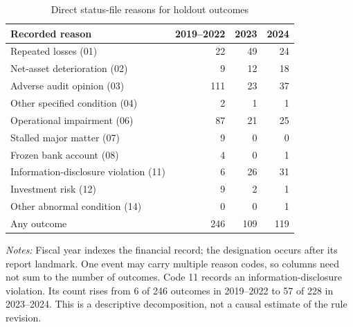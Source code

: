 \begin{table}[H]
\centering
\caption{Direct status-file reasons for holdout outcomes}
\label{tab:status-reasons}
\small
\begin{tabular}{lrrr}
\toprule
Recorded reason & 2019--2022 & 2023 & 2024 \\
\midrule
Repeated losses (01) & 22 & 49 & 24 \\
Net-asset deterioration (02) & 9 & 12 & 18 \\
Adverse audit opinion (03) & 111 & 23 & 37 \\
Other specified condition (04) & 2 & 1 & 1 \\
Operational impairment (06) & 87 & 21 & 25 \\
Stalled major matter (07) & 9 & 0 & 0 \\
Frozen bank account (08) & 4 & 0 & 1 \\
Information-disclosure violation (11) & 6 & 26 & 31 \\
Investment risk (12) & 9 & 2 & 1 \\
Other abnormal condition (14) & 0 & 0 & 1 \\
\midrule
Any outcome & 246 & 109 & 119 \\
\bottomrule
\end{tabular}
\begin{minipage}{0.94\textwidth}\footnotesize
\textit{Notes:} Fiscal year indexes the financial record; the designation occurs after its report landmark. One event may carry multiple reason codes, so columns need not sum to the number of outcomes. Code 11 records an information-disclosure violation. Its count rises from 6 of 246 outcomes in 2019--2022 to 57 of 228 in 2023--2024. This is a descriptive decomposition, not a causal estimate of the rule revision.
\end{minipage}
\end{table}
